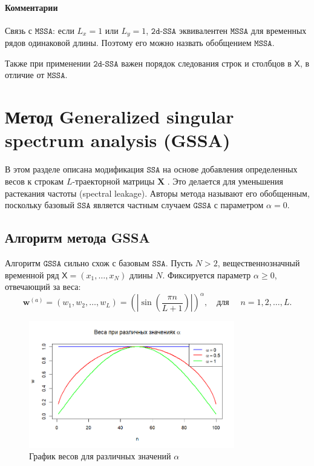 \documentclass[12pt, specialist, subf
]{disser}
\theoremstyle{definition}
\newcommand{\SSA}{\texttt{SSA}}
\newcommand{\GSSA}{\texttt{GSSA}}
\newcommand{\MSSA}{\texttt{MSSA}}
\newcommand{\DSSA}{\texttt{2d-SSA}}
\newcommand{\TS}{\mathsf{X}}
\begin{document}
\subsubsection{Комментарии}

{Связь с $\MSSA$:} если $L_x = 1$ или $L_y = 1$, $\DSSA$ эквивалентен $\MSSA$ для временных рядов одинаковой длины. Поэтому его можно назвать обобщением $\MSSA$.

Также при применении $\DSSA$ важен порядок следования строк и столбцов в $\TS$, в отличие от $\MSSA$.



\newpage




\chapter{Метод Generalized singular spectrum analysis (GSSA)}
\label{sec:gssa}

В этом разделе описана модификация $\SSA$ на основе добавления определенных весов к строкам $L$-траекторной матрицы $\mathbf{X}$ \cite{gu2024generalized}. Это делается для уменьшения растекания частоты (spectral leakage). Авторы метода называют его обобщенным, поскольку базовый $\SSA$ является частным случаем $\GSSA$ с параметром $\alpha = 0$.

\section{Алгоритм метода GSSA}
Алгоритм $\GSSA$ сильно схож с базовым $\SSA$. Пусть $N > 2$, вещественнозначный временной ряд
$\TS = (x_1, \dots, x_{N})$ длины $N$. Фиксируется параметр $\alpha \geq 0$, отвечающий за веса:
\begin{equation*}
	{\boldsymbol{w}}^{(a)} = (w_{1}, w_{2}, \ldots, w_{L}) = \left( \left| \sin\left(\frac{\pi n}{L+1}\right) \right| \right)^\alpha, \quad \text{для } \quad n = 1, 2, \dots, L.
\end{equation*}

\begin{figure}[h]
	\centering
	\includegraphics[width=0.8\textwidth]{img/weights.png} %
	\caption{График весов для различных значений \(\alpha\)} %
	\label{fig:weights} %
\end{figure}
\end{document}
